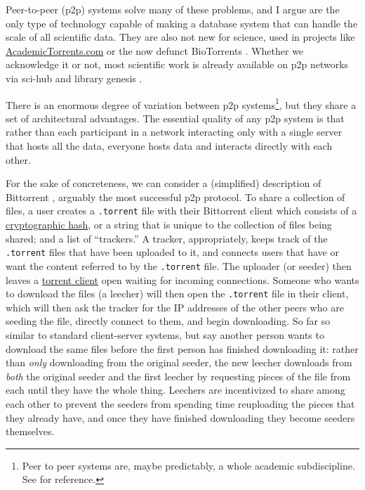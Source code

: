 Peer-to-peer (p2p) systems solve many of these problems, and I argue are
the only type of technology capable of making a database system that can
handle the scale of all scientific data. They are also not new for
science, used in projects like
\href{https://academictorrents.com/}{AcademicTorrents.com} \citep{cohenAcademicTorrentsCommunityMaintained2014, loAcademicTorrentsScalable2016}  or the now defunct BioTorrents \citep{langilleBioTorrentsFileSharing2010} . Whether we acknowledge it
or not, most scientific work is already available on p2p networks via
sci-hub and library genesis \citep{himmelsteinSciHubProvidesAccess2018, sci-hubTorrentHealthTracker2022, bookwarriorLibraryGenesisDecentralized2021} .

There is an enormous degree of variation between p2p systems\footnote{Peer
  to peer systems are, maybe predictably, a whole academic
  subdiscipline. See \citep{shenHandbookPeertoPeerNetworking2010} 
  for reference.}, but they share a set of architectural advantages. The
essential quality of any p2p system is that rather than each participant
in a network interacting only with a single server that hosts all the
data, everyone hosts data and interacts directly with each other.

For the sake of concreteness, we can consider a (simplified) description
of Bittorrent \citep{cohenBitTorrentProtocolSpecification2017} ,
arguably the most successful p2p protocol. To share a collection of
files, a user creates a \texttt{.torrent} file with their Bittorrent
client which consists of a
\href{https://en.wikipedia.org/wiki/Cryptographic_hash_function}{cryptographic
hash}, or a string that is unique to the collection of files being
shared; and a list of ``trackers.'' A tracker, appropriately, keeps
track of the \texttt{.torrent} files that have been uploaded to it, and
connects users that have or want the content referred to by the
\texttt{.torrent} file. The uploader (or seeder) then leaves a
\href{https://en.wikipedia.org/wiki/Glossary_of_BitTorrent_terms\#Client}{torrent
client} open waiting for incoming connections. Someone who wants to
download the files (a leecher) will then open the \texttt{.torrent} file
in their client, which will then ask the tracker for the IP addresses of
the other peers who are seeding the file, directly connect to them, and
begin downloading. So far so similar to standard client-server systems,
but say another person wants to download the same files before the first
person has finished downloading it: rather than \emph{only} downloading
from the original seeder, the new leecher downloads from \emph{both} the
original seeder and the first leecher by requesting pieces of the file
from each until they have the whole thing. Leechers are incentivized to
share among each other to prevent the seeders from spending time
reuploading the pieces that they already have, and once they have
finished downloading they become seeders themselves.

